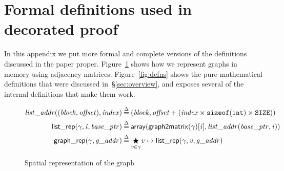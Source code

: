 \section{Formal definitions used in decorated proof}

In this appendix we put more formal and complete versions 
of the definitions discussed in the paper proper.
Figure~\ref{fig:spatial} shows how we represent graphs in 
memory using adjacency matrices.
Figure~\ref{fig:defns} shows 
the pure mathematical definitions that were discussed in~\S\ref{sec:overview}, 
and exposes several of the internal definitions that make them work.

\begin{figure}
\begin{equation*}
\begin{split}
\m{list\_addr} ((\m{block}, \m{offset}), \m{index}) &\defeq
  (\m{block}, \m{offset} + (\m{index} \times \texttt{sizeof}(\texttt{int}) \times \texttt{SIZE})) \\
\p{list\_rep}(\gamma, \m{i}, \m{base\_ptr}) &\defeq \mathsf{array}(\mathsf{graph2matrix}(\gamma)[\m{i}], \m{list\_addr}(\m{base\_ptr}, \m{i})) \\
\vspace{1em}
\p{graph\_rep}(\gamma, \m{g\_addr}) &\defeq \underset{\m{v} \in \gamma}{\bigstar} \m{v}  \mapsto\p{list\_rep}(\gamma, \m{v}, \m{g\_addr})
\end{split}
\end{equation*}
\caption{Spatial representation of the graph}
\label{fig:spatial}
\end{figure}

